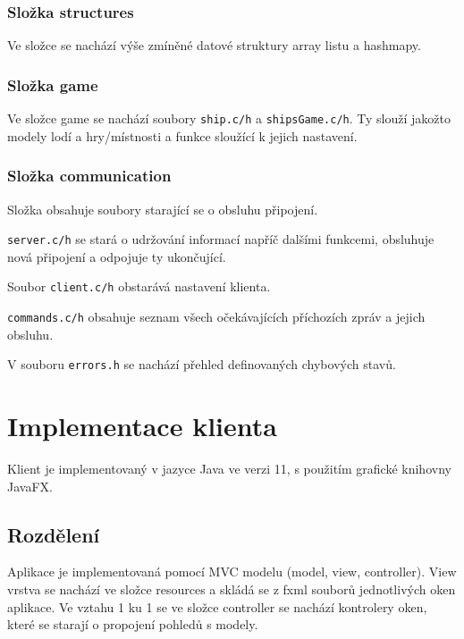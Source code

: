 \documentclass[12pt, a4paper]{article} %
\begin{document}
	\subsubsection{Složka structures}
	\par Ve složce se nachází výše zmíněné datové struktury array listu a hashmapy.
	
	\subsubsection{Složka game}
	\par Ve složce game se nachází soubory \texttt{ship.c/h} a \texttt{shipsGame.c/h}. Ty slouží jakožto modely lodí a hry/místnosti a funkce sloužící k jejich nastavení.
	
	\subsubsection{Složka communication}
	\par Složka obsahuje soubory starající se o obsluhu připojení.\\
	\par \texttt{server.c/h} se stará o udržování informací napříč dalšími funkcemi,  obsluhuje nová připojení a odpojuje ty ukončující.
	\par Soubor \texttt{client.c/h} obstarává nastavení klienta.
	\par \texttt{commands.c/h} obsahuje seznam všech očekávajících příchozích zpráv a jejich obsluhu.
	\par V souboru \texttt{errors.h} se nachází přehled definovaných chybových stavů.	
	
	\section{Implementace klienta}
	\par Klient je implementovaný v jazyce Java ve verzi 11, s použitím grafické knihovny JavaFX.
	\subsection{Rozdělení}
	\par Aplikace je implementovaná pomocí MVC modelu (model, view, controller). 
	View vrstva se nachází ve složce resources a skládá se z fxml souborů jednotlivých oken aplikace. Ve vztahu 1 ku 1  se ve složce controller se nachází kontrolery oken, které se starají o propojení pohledů s modely.\\
	
\end{document}
